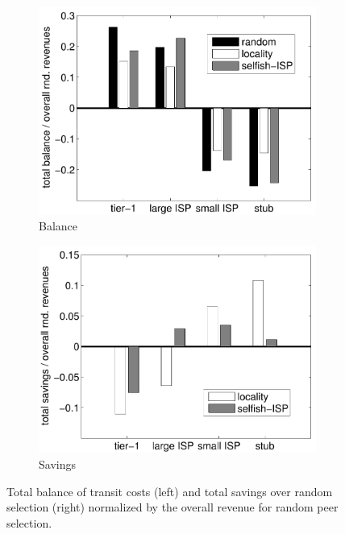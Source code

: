 \begin{figure}[bt]
	\centering
	\begin{subfigure}[b]{0.49\textwidth}
	  \includegraphics[width=\textwidth]{aslevel/p2p/results/figs/total_balance}
    \caption{Balance}
    \label{fig:total_balance}
  \end{subfigure}
	\begin{subfigure}[b]{0.49\textwidth}
	 	\includegraphics[width=\textwidth]{aslevel/p2p/results/figs/savings}
    \caption{Savings}
    \label{fig:savings}	  
	\end{subfigure}
	\caption{Total balance of transit costs (left) and total savings over random selection (right) normalized by the overall revenue for random peer selection.}
\end{figure}

